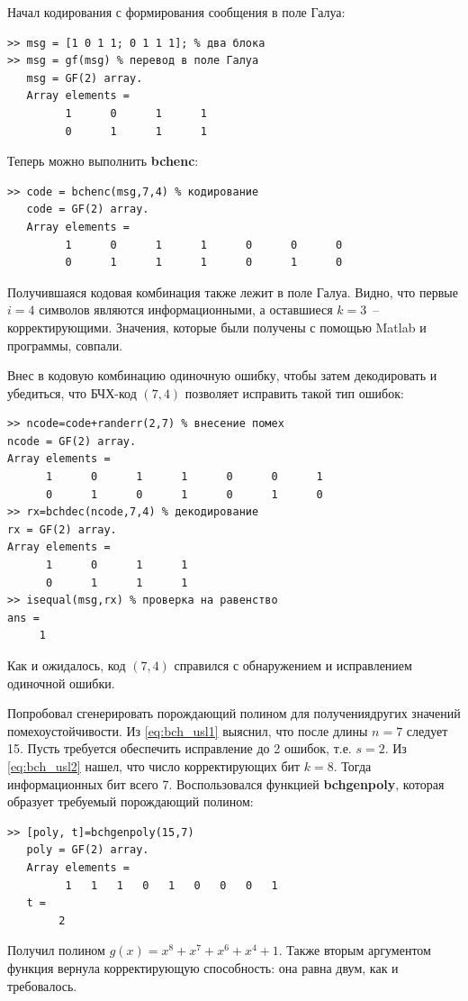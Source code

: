\documentclass[12pt,a4paper]{article}
\begin{document}
  Начал кодирования с формирования сообщения в поле Галуа:
  \begin{lstlisting}
>> msg = [1 0 1 1; 0 1 1 1]; % два блока
>> msg = gf(msg) % перевод в поле Галуа
   msg = GF(2) array. 
   Array elements = 
         1      0      1      1
         0      1      1      1
  \end{lstlisting}
  
  Теперь можно выполнить \textbf{bchenc}:  
  \begin{lstlisting}
>> code = bchenc(msg,7,4) % кодирование
   code = GF(2) array. 
   Array elements = 
         1      0      1      1      0      0      0
         0      1      1      1      0      1      0
  \end{lstlisting}
  Получившаяся кодовая комбинация также лежит в поле Галуа. Видно, что первые $i=4$ символов являются информационными, а оставшиеся $k=3$~-- корректирующими. Значения, которые были получены с помощью Matlab и программы, совпали.
  
  Внес в кодовую комбинацию одиночную ошибку, чтобы затем декодировать и убедиться, что БЧХ-код $(7,4)$ позволяет исправить такой тип ошибок:  
  \begin{lstlisting}
>> ncode=code+randerr(2,7) % внесение помех
ncode = GF(2) array. 
Array elements = 
      1      0      1      1      0      0      1
      0      1      0      1      0      1      0
>> rx=bchdec(ncode,7,4) % декодирование
rx = GF(2) array. 
Array elements = 
      1      0      1      1
      0      1      1      1
>> isequal(msg,rx) % проверка на равенство
ans =
     1
  \end{lstlisting}
  Как и ожидалось, код $(7,4)$ справился с обнаружением и исправлением одиночной ошибки.
  
  Попробовал сгенерировать порождающий полином для получения\linebreak других значений помехоустойчивости. Из \eqref{eq:bch_usl1} выяснил, что после длины $n=7$ следует 15. Пусть требуется обеспечить исправление до 2 ошибок, т.е. $s=2$. Из \eqref{eq:bch_usl2} нашел, что число корректирующих бит $k=8$. Тогда информационных бит всего 7. Воспользовался функцией \textbf{bchgenpoly}, которая образует требуемый порождающий полином:  
  \begin{lstlisting}
>> [poly, t]=bchgenpoly(15,7)
   poly = GF(2) array. 
   Array elements = 
         1   1   1   0   1   0   0   0   1
   t =
        2
  \end{lstlisting}
  Получил полином $g(x)=x^8+x^7+x^6+x^4+1$. Также вторым аргументом функция вернула корректирующую способность: она равна двум, как и требовалось.
  
\end{document}
